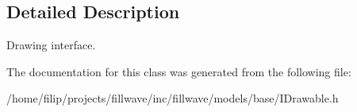 \subsection{Detailed Description}
Drawing interface. 

The documentation for this class was generated from the following file\+:\begin{DoxyCompactItemize}
\item 
/home/filip/projects/fillwave/inc/fillwave/models/base/I\+Drawable.\+h\end{DoxyCompactItemize}
